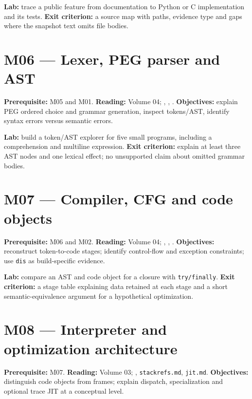 \documentclass[
  11pt,
]{report}
\newcommand{\passthrough}[1]{#1}
\begin{document}
\textbf{Lab:} trace a public feature from documentation to Python or C
implementation and its tests. \textbf{Exit criterion:} a source map with
paths, evidence type and gaps where the snapshot text omits file bodies.

\section{M06 --- Lexer, PEG parser and
AST}\label{m06-lexer-peg-parser-and-ast}

\textbf{Prerequisite:} M05 and M01. \textbf{Reading:} Volume 04;
,
,
.
\textbf{Objectives:} explain PEG ordered choice and grammar generation,
inspect tokens/AST, identify syntax errors versus semantic errors.

\textbf{Lab:} build a token/AST explorer for five small programs,
including a comprehension and multiline expression. \textbf{Exit
criterion:} explain at least three AST nodes and one lexical effect; no
unsupported claim about omitted grammar bodies.

\section{M07 --- Compiler, CFG and code
objects}\label{m07-compiler-cfg-and-code-objects}

\textbf{Prerequisite:} M06 and M02. \textbf{Reading:} Volume 04;
,
,
. \textbf{Objectives:}
reconstruct token-to-code stages; identify control-flow and exception
constraints; use \passthrough{\lstinline!dis!} as build-specific
evidence.

\textbf{Lab:} compare an AST and code object for a closure with
\passthrough{\lstinline!try/finally!}. \textbf{Exit criterion:} a stage
table explaining data retained at each stage and a short
semantic-equivalence argument for a hypothetical optimization.

\section{M08 --- Interpreter and optimization
architecture}\label{m08-interpreter-and-optimization-architecture}

\textbf{Prerequisite:} M07. \textbf{Reading:} Volume 03;
,
\passthrough{\lstinline!stackrefs.md!},
\passthrough{\lstinline!jit.md!}. \textbf{Objectives:} distinguish code
objects from frames; explain dispatch, specialization and optional trace
JIT at a conceptual level.
\end{document}
